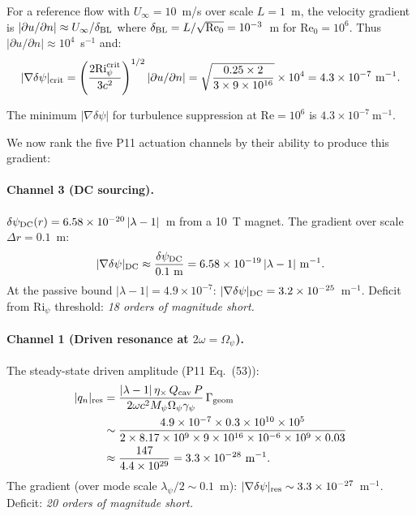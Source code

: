 \documentclass[11pt,twocolumn]{article}
\newcommand{\dpsi}{\delta\psi}
\newcommand{\lam}{\lambda}
\newcommand{\Opsi}{\Omega_\psi}
\newcommand{\gpsi}{\gamma_\psi}
\newcommand{\Mpsi}{M_\psi}
\newcommand{\Rey}{\mathrm{Re}}
\newcommand{\Ri}{\mathrm{Ri}}
\begin{document}
For a reference flow with $U_\infty = 10$~m/s over scale $L = 1$~m, the
velocity gradient is $|\partial u/\partial n| \approx U_\infty/\delta_{\rm BL}$
where $\delta_{\rm BL} = L/\sqrt{\Rey_0} = 10^{-3}$~m for $\Rey_0 = 10^6$.
Thus $|\partial u/\partial n| \approx 10^4$~s$^{-1}$ and:
\begin{equation}
|\nabla\dpsi|_{\rm crit}
= \left(\frac{2\Ri_\psi^{\rm crit}}{3c^2}\right)^{1/2}
|\partial u/\partial n|
= \sqrt{\frac{0.25\times2}{3\times9\times10^{16}}}\times10^4
= 4.3\times10^{-7}~\text{m}^{-1}.
\label{eq:nabla_dpsi_crit}
\end{equation}

The minimum $|\nabla\dpsi|$ for turbulence suppression at $\Rey = 10^6$
is $\boxed{4.3\times10^{-7}~\text{m}^{-1}}$.

We now rank the five P11 actuation channels by their ability to produce
this gradient:

\paragraph{Channel 3 (DC sourcing).}
$\dpsi_{\rm DC}(r) = 6.58\times10^{-20}\,|\lam-1|$~m from a 10~T magnet.
The gradient over scale $\Delta r = 0.1$~m:
\begin{equation}
|\nabla\dpsi|_{\rm DC} \approx \frac{\dpsi_{\rm DC}}{0.1~\text{m}}
= 6.58\times10^{-19}\,|\lam-1|~\text{m}^{-1}.
\end{equation}
At the passive bound $|\lam-1| = 4.9\times10^{-7}$:
$|\nabla\dpsi|_{\rm DC} = 3.2\times10^{-25}$~m$^{-1}$.
Deficit from $\Ri_\psi$ threshold: \emph{18 orders of magnitude short.}

\paragraph{Channel 1 (Driven resonance at $2\omega = \Opsi$).}
The steady-state driven amplitude (P11 Eq.~(53)):
\begin{align}
|q_n|_{\rm res} &= \frac{|\lam-1|\,\eta_\times\,Q_{\rm cav}\,P}
{2\omega c^2\Mpsi\Opsi\gpsi}\,\Gamma_{\rm geom}
\nonumber\\
&\sim \frac{4.9\times10^{-7}\times0.3\times10^{10}\times10^5}
{2\times8.17\times10^9\times9\times10^{16}\times10^{-6}\times10^9\times0.03}
\nonumber\\
&\approx \frac{147}{4.4\times10^{29}}
= 3.3\times10^{-28}~\text{m}^{-1}.
\end{align}
The gradient (over mode scale $\lambda_\psi/2 \sim 0.1$~m):
$|\nabla\dpsi|_{\rm res} \sim 3.3\times10^{-27}$~m$^{-1}$.
Deficit: \emph{20 orders of magnitude short.}
\end{document}
